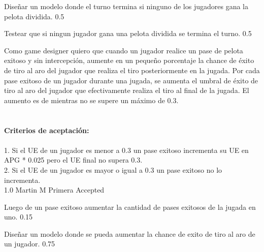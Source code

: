 		{Diseñar un modelo donde el turno termina si ninguno de los jugadores gana la pelota dividida.} %
		{} %
		{0.5} %
		{} %
		{} %
		{} %

		{} %
		{Testear que si ningun jugador gana una pelota dividida se termina el turno.} %
		{0.5} %
		{} %
		{} %
		{} %
\vspace{20pt}


	{Como game designer quiero que cuando un jugador realice un pase de pelota exitoso y sin intercepci\'on, aumente en un peque\~no porcentaje la chance de \'exito de tiro al aro del jugador que realiza el tiro posteriormente en la jugada.} %
	{Por cada pase exitoso de un jugador durante una jugada, se aumenta el umbral de éxito de tiro al aro del jugador que efectivamente realiza el tiro al final de la jugada. El aumento es de  mientras no se supere un máximo de 0.3. \\
  \\
  \\
\textbf{Criterios de aceptación:}\\
  \\
1. Si el UE de un jugador es menor a 0.3 un pase exitoso incrementa su UE en APG * 0.025 pero el UE final no supera 0.3. \\
2. Si el UE de un jugador es mayor o igual a 0.3 un pase exitoso no lo incrementa.
 \\
} %
	{} %
	{1.0} %
	{Martin M} %
	{Primera} %
	{Accepted} %

		{Luego de un pase exitoso aumentar la cantidad de pases exitosos de la jugada en uno.} %
		{} %
		{0.15} %
		{} %
		{} %
		{} %

		{Diseñar un modelo donde se pueda aumentar la chance de exito de tiro al aro de un jugador.} %
		{} %
		{0.75} %
		{} %
		{} %
		{} %


